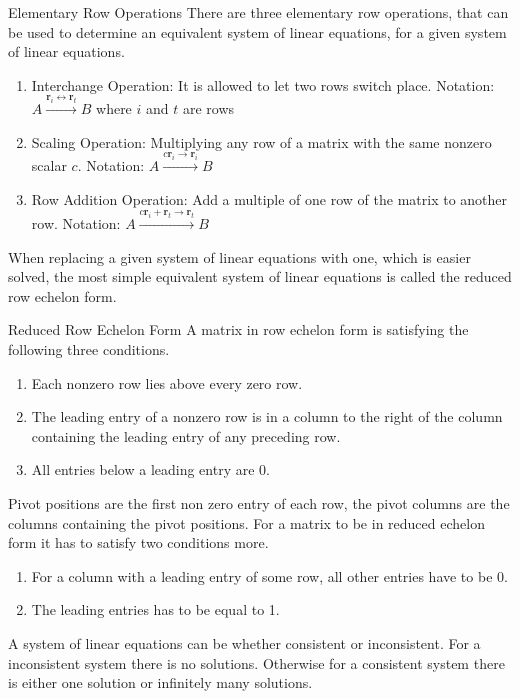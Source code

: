 \begin{definition}{Elementary Row Operations}
There are three elementary row operations, that can be used to determine an equivalent system of linear equations, for a given system of linear equations.
\begin{enumerate}
    \item Interchange Operation:
    It is allowed to let two rows switch place.
    Notation: $A\xrightarrow{\textbf{r}_i\leftrightarrow \textbf{r}_t} B$ where $i$ and $t$ are rows
    \item Scaling Operation:
    Multiplying any row of a matrix with the same nonzero scalar $c$.
    Notation: $A\xrightarrow{c\textbf{r}_i\rightarrow \textbf{r}_i} B$
    \item Row Addition Operation:
    Add a multiple of one row of the matrix to another row.
    Notation: $A\xrightarrow{c\textbf{r}_i+\textbf{r}_t\rightarrow \textbf{r}_t} B$
\end{enumerate}
\cite[32]{LiAl}
\end{definition}

When replacing a given system of linear equations with one, which is easier solved, the most simple equivalent system of linear equations is called the reduced row echelon form. 
\begin{definition}{Reduced Row Echelon Form}
A matrix in row echelon form is satisfying the following three conditions.
\begin{enumerate}
    \item Each nonzero row lies above every zero row.
    \item The leading entry of a nonzero row is in a column to the right of the column containing the leading entry of any preceding row.
    \item All entries below a leading entry are $0$.
\end{enumerate}
Pivot positions are the first non zero entry of each row, the pivot columns are the columns containing the pivot positions. 
For a matrix to be in reduced echelon form it has to satisfy two conditions more. 
\begin{enumerate}
    \item For a column with a leading entry of some row, all other entries have to be 0.
    \item The leading entries has to be equal to 1.
\end{enumerate}
\cite[33]{LiAl}
\end{definition}
A system of linear equations can be whether consistent or inconsistent. For a inconsistent system there is no solutions.
Otherwise for a consistent system there is either one solution or infinitely many solutions.


